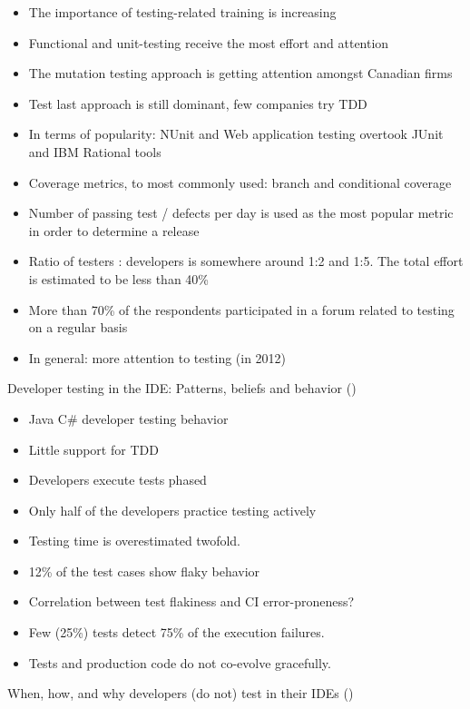 \documentclass[]{book}
\providecommand{\tightlist}{%
  \setlength{\itemsep}{0pt}\setlength{\parskip}{0pt}}
\begin{document}
\begin{itemize}
\tightlist
\item
  The importance of testing-related training is increasing
\item
  Functional and unit-testing receive the most effort and attention
\item
  The mutation testing approach is getting attention amongst Canadian
  firms
\item
  Test last approach is still dominant, few companies try TDD
\item
  In terms of popularity: NUnit and Web application testing overtook
  JUnit and IBM Rational tools
\item
  Coverage metrics, to most commonly used: branch and conditional
  coverage
\item
  Number of passing test / defects per day is used as the most popular
  metric in order to determine a release
\item
  Ratio of testers : developers is somewhere around 1:2 and 1:5. The
  total effort is estimated to be less than 40\%
\item
  More than 70\% of the respondents participated in a forum related to
  testing on a regular basis
\item
  In general: more attention to testing (in 2012)
\end{itemize}

Developer testing in the IDE: Patterns, beliefs and behavior
(\citet{beller2017developer})

\begin{itemize}
\tightlist
\item
  Java C\# developer testing behavior
\item
  Little support for TDD
\item
  Developers execute tests phased
\item
  Only half of the developers practice testing actively
\item
  Testing time is overestimated twofold.
\item
  12\% of the test cases show flaky behavior
\item
  Correlation between test flakiness and CI error-proneness?
\item
  Few (25\%) tests detect 75\% of the execution failures.
\item
  Tests and production code do not co-evolve gracefully.
\end{itemize}

When, how, and why developers (do not) test in their IDEs
(\citet{beller2015})
\end{document}
